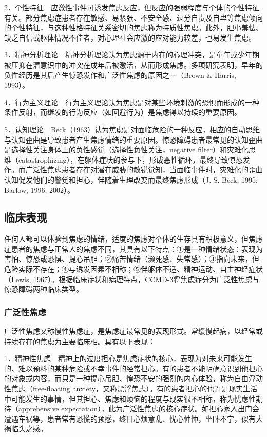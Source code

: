 2．个性特征　应激性事件可诱发焦虑反应，但反应的强弱程度与个体的个性特征有关。部分焦虑症患者存在敏感、易紧张、不安全感、过分自责及自卑等焦虑倾向的个性特征，与这种性格特征关系密切的焦虑称为特质性焦虑。此外，胆小羞怯、缺乏自信或躯体情况不佳者，对心理社会应激的应对能力较差，也易发生焦虑。

3．精神分析理论　精神分析理论认为焦虑源于内在的心理冲突，是童年或少年期被压抑在潜意识中的冲突在成年后被激活，从而形成焦虑。多项研究表明，早年的负性经历是其后产生惊恐发作和广泛性焦虑的原因之一（Brown
\& Harris, 1993）。

4．行为主义理论　行为主义理论认为焦虑是对某些环境刺激的恐惧而形成的一种条件反射，而继发的行为反应（如回避行为）是焦虑得以持续的重要原因。

5．认知理论　Beck（1963）认为焦虑是对面临危险的一种反应，相应的自动思维与认知歪曲是导致患者产生焦虑情绪的重要原因。惊恐障碍患者最常见的认知歪曲是选择性关注身体上的负性感觉（选择性负性关注，negative
filter）和灾难化思维（catastrophizing），在躯体症状的参与下，形成恶性循环，最终导致惊恐发作。而广泛性焦虑患者存在对潜在威胁的敏锐觉知，当面临事件时，灾难化的歪曲认知促发他们的警觉和担心，伴随着生理改变而最终焦虑形成（J.
S. Beck, 1995; Barlow, 1996, 2002）。

\subsection{临床表现}

任何人都可以体验到焦虑的情绪，适度的焦虑对个体的生存具有积极意义，但焦虑症患者的焦虑与正常人的焦虑不同，其具有以下特点：①是一种情绪状态：表现为害怕、惊恐或恐惧、提心吊胆；②痛苦情绪（濒死感、失常感）；③指向未来，但危险实际不存在；④与诱发因素不相称；⑤伴躯体不适、精神运动、自主神经症状（Lewis,
1967）。根据临床症状和病理特点，CCMD-3将焦虑症分为广泛性焦虑与惊恐障碍两种临床类型。

\subsubsection{广泛性焦虑}

广泛性焦虑又称慢性焦虑症，是焦虑症最常见的表现形式。常缓慢起病，以经常或持续存在的焦虑为主要临床相。具有以下表现：

1．精神性焦虑　精神上的过度担心是焦虑症状的核心，表现为对未来可能发生的、难以预料的某种危险或不幸事件的经常担心。有的患者不能明确意识到他担心的对象或内容，而只是一种提心吊胆、惶恐不安的强烈的内心体验，称为自由浮动性焦虑（free-floating
anxiety，又称漂浮焦虑）。有的患者担心的也许是现实生活中可能发生的事情，但其担心、焦虑和烦恼的程度与现实很不相称，称为忧虑性期待（apprehensive
expectation），此为广泛性焦虑的核心症状。如担心家人出门会遭遇车祸等，患者常有恐慌的预感，终日心烦意乱、忧心忡忡，坐卧不宁，似有大祸临头之感。

